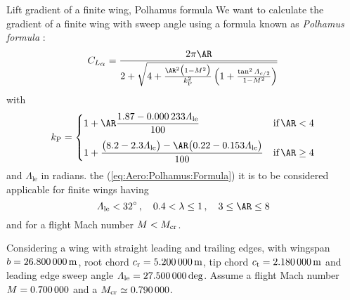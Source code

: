 \documentclass[[12pt,twoside]{book}
\begin{document}
%

%
\begin{myExampleX}{Lift gradient of a finite wing, Polhamus formula}{}%
\label{example:Lift:Gradient:Polhamus:Formula}
%
\noindent
We want to calculate the gradient  of a finite wing
with sweep angle using a formula known as \emph{Polhamus formula }:
\begin{equation}\label{eq:Aero:Polhamus:Formula}
C_{L_{\mathlarger{\alpha}}} = 
   \frac{ 2\pi\AR
   }{
      2 + \sqrt{ 4+ \frac{\AR^2 \big(1-M^2\big)}{k_\mathrm{P}^2}\left({1+\frac{\tan^2\Lambda_{c/2}}{1-M^2}} \right) }
   }
\end{equation}
with
\begin{equation}\label{eq:Aero:K:Polhamus:Formula}
k_\mathrm{P}={
   \begin{cases}      1+\AR\dfrac{\num[round-precision=2]{1.87}-\num[round-precision=6]{0.000233}\Lambda_\mathrm{le}}{\num[round-precision=0]{100}}
      & \text{if}\, \AR<4
      \\[1em]
      1+\dfrac{
         \big(\num[round-precision=1]{8.2}-\num[round-precision=1]{2.3}\Lambda_\mathrm{le}\big)
         - \AR\big(\num[round-precision=2]{0.22}-\num[round-precision=3]{0.153}\Lambda_\mathrm{le}\big)
         }{\num[round-precision=0]{100}}
      & \text{if}\, \AR \ge 4
   \end{cases}
}
\end{equation}
and $\Lambda_\text{le}$ in radians.
the (\ref{eq:Aero:Polhamus:Formula}) it is to be considered applicable for finite wings
having
\begin{equation}\label{eq:Aero:Limitations:Polhamus:Formula}
\Lambda_\mathrm{le} < \SI[round-precision=0]{32}{\degree}
\,,\quad
\SI[round-precision=1]{0.4}{} < \lambda \le 1
\,,\quad
3 \le \AR \le 8
\end{equation}
and for a flight Mach number $\Mach < \Mach_\mathrm{cr}$.

Considering a wing with straight leading and trailing edges,
with wingspan $b=\SI[round-precision=1]{\mySpanWingMT}{\metre}$,
root chord $c_\mathrm{r}=\SI[round-precision=2]{\myChordRootWingMT}{\metre}$,
tip chord $c_\mathrm{t}=\SI[round-precision=2]{\myChordTipWingMT}{\metre}$
and leading edge sweep angle
$\Lambda_\mathrm{le}=\SI[round-precision=1]{\mySweepLEWingDEG}{\deg}$.
Assume a flight Mach number $\Mach=\SI[round-precision=1]{\myMach}{}$
and a $\Mach_\mathrm{cr}\simeq\SI[round-precision=2]{\myCriticalMachNumberMACWing}{}$.


\end{myExampleX}
\end{document}
